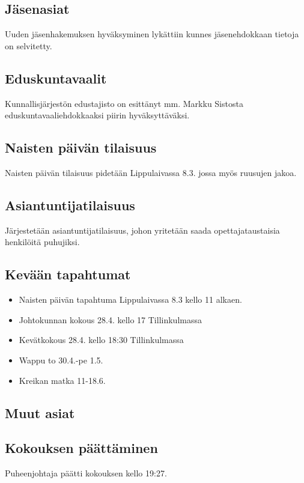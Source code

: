 \documentclass[a4paper,12pt]{article}
\begin{document}
\subsection{Jäsenasiat}
Uuden jäsenhakemuksen hyväksyminen lykättiin kunnes jäsenehdokkaan tietoja on selvitetty.
\subsection{Eduskuntavaalit}
Kunnallisjärjestön edustajisto on esittänyt mm. Markku Sistosta eduskuntavaaliehdokkaaksi piirin hyväksyttäväksi.
\subsection{Naisten päivän tilaisuus}
Naisten päivän tilaisuus pidetään Lippulaivassa 8.3. jossa myös ruusujen jakoa.
\subsection{Asiantuntijatilaisuus}
Järjestetään asiantuntijatilaisuus, johon yritetään saada opettajataustaisia henkilöitä puhujiksi.
\subsection{Kevään tapahtumat}
\begin{itemize}
\item{Naisten päivän tapahtuma Lippulaivassa} 8.3 kello 11 alkaen.
\item{Johtokunnan kokous} 28.4. kello 17 Tillinkulmassa
\item{Kevätkokous} 28.4. kello 18:30 Tillinkulmassa
\item{Wappu} to 30.4.-pe 1.5.
\item{Kreikan matka} 11-18.6.
\end{itemize}
\subsection{Muut asiat}
\subsection{Kokouksen päättäminen}
Puheenjohtaja päätti kokouksen kello 19:27.
\end{document}
